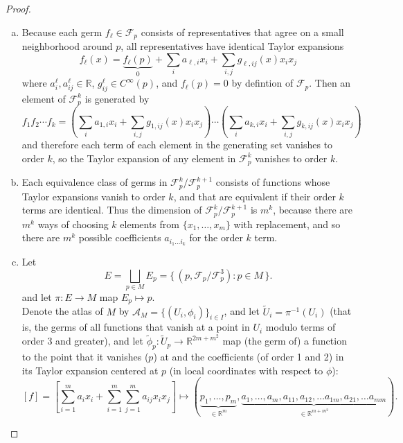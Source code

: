\documentclass{article}
\begin{document}
\begin{proof} $ $\\
  \begin{enumerate}[(a)]
    \item
      Because each germ $f_\ell \in \mathcal{F}_p$ consists of representatives that
      agree on a small neighborhood around $p$, all representatives have
      identical Taylor expansions \[
        f_\ell(x) = \underbrace{f_\ell(p)}_0 + \sum_i a_{\ell,i} x_i
          + \sum_{i,j} g_{\ell,ij}(x) x_i x_j
      \] where
      $a^\ell_i, a^\ell_{ij} \in \mathbb{R}$, $g^\ell_{ij} \in C^\infty(p)$, and
      $f_\ell(p) = 0$ by defintion of $\mathcal{F}_p$.
      Then an element of $\mathcal{F}_p^k$ is generated by \[
        f_1 f_2 \cdots f_k =
          \left(\sum_i a_{1,i} x_i + \sum_{i,j} g_{1,ij}(x) x_i x_j\right) \cdots
          \left(\sum_i a_{k,i} x_i + \sum_{i,j} g_{k,ij}(x) x_i x_j\right)
      \] and therefore each term of each element in the generating set vanishes
      to order $k$, so the Taylor expansion of any element in $\mathcal{F}_p^k$
      vanishes to order $k$.
    \item Each equivalence class of germs in
      $\mathcal{F}_p^k/\mathcal{F}_p^{k+1}$ consists of functions whose Taylor
      expansions vanish to order $k$, and that are equivalent if their order $k$
      terms are identical.
      Thus the dimension of $\mathcal{F}_p^k/\mathcal{F}_p^{k+1}$ is $m^k$,
      because there are $m^k$ ways of choosing $k$ elements from
      $\{ x_1, \hdots, x_m \}$ with replacement, and so there are $m^k$ possible
      coefficients $a_{i_1 \hdots i_k}$ for the order $k$ term.
    \item
      Let \[
        E = \bigsqcup_{p \in M} E_p
          = \{\, (p, \mathcal{F}_p/\mathcal{F}_p^3) : p \in M \,\}.
      \] and let $\pi: E \rightarrow M$ map $E_p \mapsto p$.
      \\
      Denote the atlas of $M$ by $\mathcal{A}_M = \{ (U_i, \phi_i) \}_{i \in I}$,
      and let $\widetilde{U}_i = \pi^{-1}(U_i)$ (that is, the germs of all
      functions that vanish at a point in $U_i$ modulo terms of order 3 and
      greater), and let
      $\widetilde{\phi}_p: \widetilde{U}_p \rightarrow \mathbb{R}^{2m + m^2}$ map
      (the germ of) a function to the point that it vanishes ($p$) at and the
      coefficients (of order 1 and 2) in its Taylor expansion centered at $p$
      (in local coordinates with respect to $\phi$):
      \[
        [f] = \left[
          \sum_{i=1}^m a_i x_i + \sum_{i=1}^m\sum_{j=1}^m a_{ij} x_i x_j
        \right] \mapsto
        (\underbrace{p_1, \hdots, p_m}_{\in \mathbb{R}^m}, \underbrace{
        a_1, \hdots, a_m, a_{11}, a_{12}, \hdots a_{1m}, a_{21}, \hdots a_{mm}
        }_{\in \mathbb{R}^{m + m^2}}).
      \]
  \end{enumerate}
\end{proof}
\end{document}
